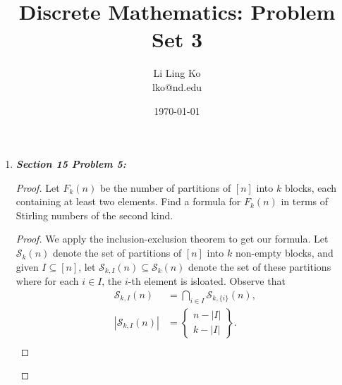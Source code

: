 \documentclass{article}
\begin{document}
\title{Discrete Mathematics: Problem Set 3}
\author{Li Ling Ko\\ lko@nd.edu}
\date{\today}
\maketitle

\begin{enumerate}[label={\bf Q\arabic*:}]
  \item \it \textbf{Section 15 Problem 5:}
    \begin{proof}
      Let $F_k(n)$ be the number of partitions of $[n]$ into $k$ blocks,
      each containing at least two elements. Find a formula for $F_k(n)$ in
      terms of Stirling numbers of the second kind.

      \begin{proof}
        We apply the inclusion-exclusion theorem to get our formula.
        Let $\mathcal{S}_k(n)$ denote the set of partitions of $[n]$ into
        $k$ non-empty blocks, and given $I\subseteq[n]$, let
        $\mathcal{S}_{k,I}(n)\subseteq \mathcal{S}_k(n)$ denote the set of
        these partitions where for each $i\in I$, the $i$-th element is
        isloated. Observe that
        \begin{align*}
          \mathcal{S}_{k,I}(n) &=\bigcap_{i\in I} \mathcal{S}_{k,\{i\}}(n),\\
          |\mathcal{S}_{k,I}(n)| &=
            \begin{Bmatrix}n-|I|\\k-|I|\end{Bmatrix}.\\
        \end{align*}


\end{proof}
\end{proof}
\end{enumerate}
\end{document}
